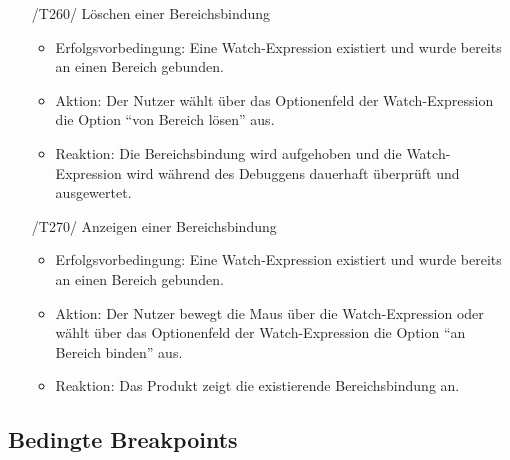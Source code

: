 \documentclass[parskip=full]{scrartcl}
\begin{document}
\begin{itemize}
	\item[/T260/] Löschen einer Bereichsbindung
		\begin{itemize}
		\item Erfolgsvorbedingung: Eine Watch-Expression existiert und wurde bereits an einen Bereich gebunden. 
		\item Aktion: Der Nutzer wählt über das Optionenfeld der Watch-Expression die Option \enquote{von Bereich lösen} aus.
		\item Reaktion:	Die Bereichsbindung wird aufgehoben und die Watch-Expression wird während des Debuggens dauerhaft überprüft und ausgewertet.
		\end{itemize}	
	
	\item[/T270/] Anzeigen einer Bereichsbindung
		\begin{itemize}
		\item Erfolgsvorbedingung: Eine Watch-Expression existiert und wurde bereits an einen Bereich gebunden. 
		\item Aktion: Der Nutzer bewegt die Maus über die Watch-Expression oder wählt über das Optionenfeld der Watch-Expression die Option \enquote{an Bereich binden} aus. 
		\item Reaktion:	Das Produkt zeigt die existierende Bereichsbindung an.  
		\end{itemize}	
	
		
\end{itemize}
\subsection{Bedingte Breakpoints}
\end{document}
